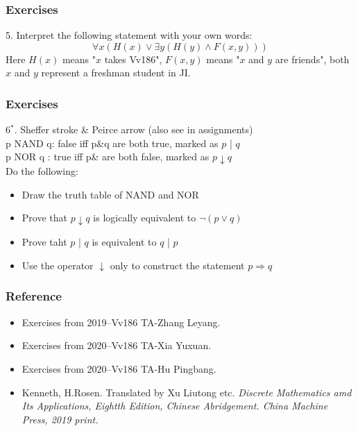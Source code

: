 \documentclass{beamer}
\newcommand{\myfont}{\rmfamily\normalsize\upshape\mdseries}
\begin{document}
\begin{frame}
    \frametitle{Exercises}
    5. Interpret the following statement with your own words:\\
    \begin{equation*}
        \forall x(H(x)\vee \exists y(H(y)\wedge F(x,y)))
    \end{equation*}    
    Here $H(x)$ means "$x$ takes Vv186", $F(x,y)$ means "$x$ and $y$ are friends", 
    both $x$ and $y$ represent a freshman student in JI.
\end{frame}
\begin{frame}
    \frametitle{Exercises}
    6$^*$. Sheffer stroke \& Peirce arrow (also see in assignments)\\[1em]
    p NAND q: false iff p\&q are both true, marked as $p$ | $q$ \\
    p NOR q : \* true iff p\& are both false, marked as $p\downarrow q$\\[1em]
    Do the following: \\
    \begin{itemize}
        \item Draw the truth table of NAND and NOR
        \item Prove that $p\downarrow q$ is logically equivalent to $\neg(p\vee q)$
        \item Prove taht $p$ | $q$ is equivalent to $q$ | $p$
        \item Use the operator $\downarrow$ only to construct the statement $p\Rightarrow q$
    \end{itemize}
\end{frame}
\begin{frame}
    \frametitle{Reference}
    \begin{itemize}
        \item Exercises from 2019--Vv186 TA-Zhang Leyang.
        \item Exercises from 2020--Vv186 TA-Xia Yuxuan.
        \item Exercises from 2020--Vv186 TA-Hu Pingbang.
        \item Kenneth, H.Rosen. Translated by Xu Liutong etc. \itshape Discrete Mathematics amd Its Applications\myfont, 
                 Eightth Edition, Chinese Abridgement. China Machine Press, 2019 print.
    \end{itemize}
\end{frame}
\end{document}
